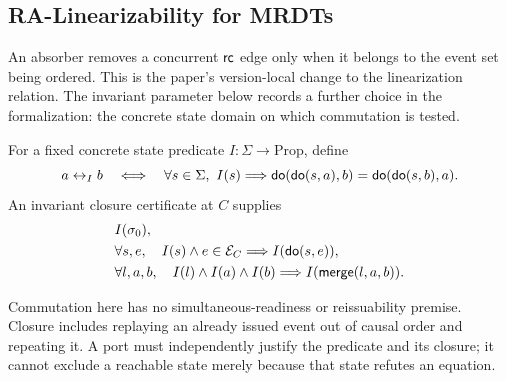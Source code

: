 \subsection{RA-Linearizability for MRDTs}
An absorber removes a concurrent $\mathsf{rc}$ edge only when it belongs
to the event set being ordered. This is the paper's version-local change to
the linearization relation. The invariant parameter below records a further
choice in the formalization: the concrete state domain on which commutation
is tested.

\begin{definition}
\label{def:invariant}
For a fixed concrete state predicate $I:\Sigma\to\mathrm{Prop}$, define
\[
 a\mathrel{\leftrightarrow_I}b\quad\Longleftrightarrow\quad
 \forall s\in\Sigma,\ I(s)\Longrightarrow
 \mathsf{do}(\mathsf{do}(s,a),b)=\mathsf{do}(\mathsf{do}(s,b),a).
\]
An invariant closure certificate at $C$ supplies
\begin{align*}
&I(\sigma_0),\\
&\forall s,e,\quad I(s)\land e\in\mathcal E_C\Longrightarrow I(\mathsf{do}(s,e)),\\
&\forall l,a,b,\quad I(l)\land I(a)\land I(b)
 \Longrightarrow I(\mathsf{merge}(l,a,b)).
\end{align*}
\end{definition}
Commutation here has no simultaneous-readiness or reissuability premise.
Closure includes replaying an already issued event out of causal order and
repeating it. A port must independently justify the predicate and its closure;
it cannot exclude a reachable state merely because that state refutes an equation.


